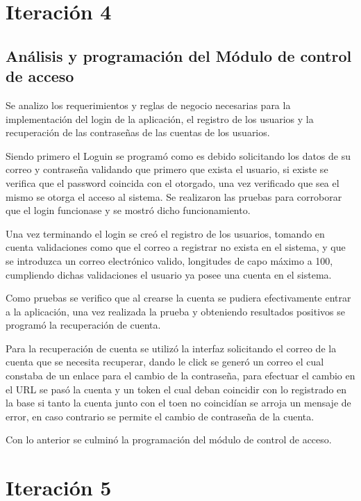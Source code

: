 \section{Iteración 4}
\subsection{Análisis y programación del Módulo de control de acceso}

Se analizo los requerimientos y reglas de negocio necesarias para la implementación del login de la aplicación, el registro de los usuarios y la recuperación de las contraseñas de las cuentas de los usuarios. 

Siendo primero el Loguin se programó como es debido solicitando los datos de su correo y contraseña validando que primero que exista el usuario, si existe se verifica que el password coincida con el otorgado, una vez verificado que sea el mismo se otorga el acceso al sistema. Se realizaron las pruebas para corroborar que el login funcionase y se mostró dicho funcionamiento. 

Una vez terminando el login se creó el registro de los usuarios, tomando en cuenta validaciones como que el correo a registrar no exista en el sistema, y que se introduzca un correo electrónico valido, longitudes de capo máximo a 100, cumpliendo dichas validaciones el usuario ya posee una cuenta en el sistema.  

Como pruebas se verifico que al crearse la cuenta se pudiera efectivamente entrar a la aplicación, una vez realizada la prueba y obteniendo resultados positivos se programó la recuperación de cuenta. 

Para la recuperación de cuenta se utilizó la interfaz solicitando el correo de la cuenta que se necesita recuperar, dando le click se generó un correo el cual constaba de un enlace para el cambio de la contraseña, para efectuar el cambio en el URL se pasó la cuenta y un token el cual deban coincidir con lo registrado en la base si tanto la cuenta junto con el toen no coincidían se arroja un mensaje de error, en caso contrario se permite el cambio de contraseña de la cuenta. 

Con lo anterior se culminó la programación del módulo de control de acceso.

\section{Iteración 5}
